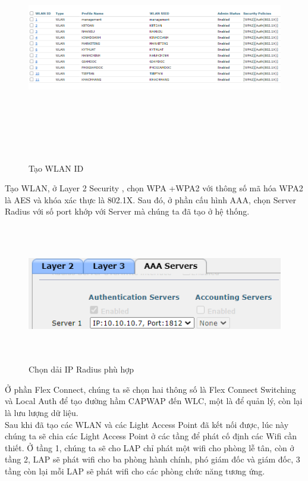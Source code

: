 \documentclass[12pt,a4paper]{report}
\begin{document}
\begin{figure}[H]
    \centering
    \includegraphics[width=16cm, height=10cm]{img/IDWLAN.png}
    \caption{Tạo WLAN ID }
    \label{hinh46d}
\end{figure}
\hspace*{1cm}Tạo WLAN, ở Layer 2 Security , chọn WPA +WPA2 với thông số mã hóa WPA2 là AES và khóa xác thực là 802.1X. Sau đó, ở phần cấu hình AAA, chọn Server Radius với số port khớp với Server mà chúng ta đã tạo ở hệ thống.\\
\begin{figure}[H]
    \centering
    \includegraphics[width=12cm, height=6cm]{img/4.6e.png}
    \caption{Chọn dải IP Radius phù hợp}
    \label{hinh46e}
\end{figure}
\hspace*{1cm}Ở phần Flex Connect, chúng ta sẽ chọn hai thông số là Flex Connect Switching và Local Auth để tạo đường hầm CAPWAP đến WLC, một là để quản lý, còn lại là lưu lượng dữ liệu.\\
\hspace*{1cm}Sau khi đã tạo các WLAN và các Light Access Point đã kết nối được, lúc này chúng ta sẽ chia các Light Access Point ở các tầng để phát cố định các Wifi cần thiết. Ở tầng 1, chúng ta sẽ cho LAP chỉ phát một wifi cho phòng lễ tân, còn ở tầng 2, LAP sẽ phát wifi cho ba phòng hành chính, phó giám đốc và giám đốc, 3 tầng còn lại mỗi LAP sẽ phát wifi cho các phòng chức năng tương ứng.\\
\end{document}
